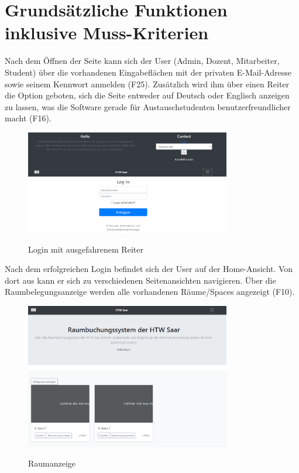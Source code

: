 \documentclass[a4paper,report,headsepline]{scrreprt}
\begin{document}
\section{Grundsätzliche Funktionen inklusive Muss-Kriterien}
Nach dem Öffnen der Seite kann sich der User (Admin, Dozent, Mitarbeiter, Student) über die vorhandenen Eingabeflächen mit der privaten E-Mail-Adresse sowie seinem Kennwort anmelden (F25). Zusätzlich wird ihm über einen Reiter die Option geboten, sich die Seite entweder auf Deutsch oder Englisch anzeigen zu lassen, was die Software gerade für Austauschstudenten benutzerfreundlicher macht (F16). 
\begin{figure}[h]
    \centering
    \caption{Login mit ausgefahrenem Reiter}
    \includegraphics[width=0.8\textwidth]{Login mit ausgefahrenem Reiter}
    \label{fig:Login mit ausgefahrenem Reiter}
\end{figure}
Nach dem erfolgreichen Login befindet sich der User auf der Home-Ansicht. Von dort aus kann er sich zu verschiedenen Seitenansichten navigieren. Über die Raumbelegungsanzeige werden alle vorhandenen Räume/Spaces angezeigt (F10).
\begin{figure}[h]
    \centering
    \caption{Raumanzeige}
    \includegraphics[width=0.8\textwidth]{Raumanzeige}
    \label{fig:Raumanzeige}
\end{figure}
\end{document}
